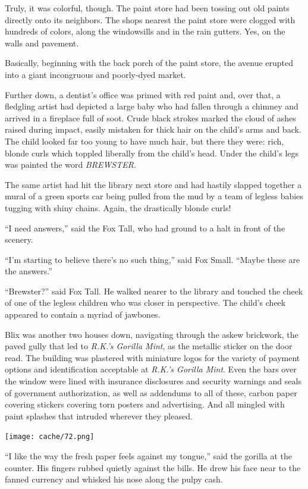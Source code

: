 \documentclass[12pt,twoside]{report}
\begin{document}
Truly, it was colorful, though.  The paint store had been tossing out
old paints directly onto its neighbors.  The shops nearest the paint
store were clogged with hundreds of colors, along the windowsills and
in the rain gutters.  Yes, on the walls and pavement.

Basically, beginning with the back porch of the paint store, the
avenue erupted into a giant incongruous and poorly-dyed market.

Further down, a dentist's office was primed with red paint and, over
that, a fledgling artist had depicted a large baby who had fallen
through a chimney and arrived in a fireplace full of soot. Crude black
strokes marked the cloud of ashes raised during impact, easily
mistaken for thick hair on the child's arms and back.  The child
looked far too young to have much hair, but there they were: rich,
blonde curls which toppled liberally from the child's head.  Under the
child's legs was painted the word {\em BREWSTER}.

The same artist had hit the library next store and had hastily slapped
together a mural of a green sports car being pulled from the mud by a
team of legless babies tugging with shiny chains. Again, the
drastically blonde curls!

``I need answers,'' said the Fox Tall, who had ground to a halt in
front of the scenery.

``I'm starting to believe there's no such thing,'' said Fox Small.
``Maybe these are the answers.''

``Brewster?'' said Fox Tall.  He walked nearer to the library and
touched the cheek of one of the legless children who was closer in
perspective.  The child's cheek appeared to contain a myriad of
jawbones.

Blix was another two houses down, navigating through the askew
brickwork, the paved gully that led to {\em R.K.'s Gorilla Mint}, as
the metallic sticker on the door read.  The building was plastered
with miniature logos for the variety of payment options and
identification acceptable at {\em R.K.'s Gorilla Mint}.  Even the bars
over the window were lined with insurance disclosures and security
warnings and seals of government authorization, as well as addendums
to all of these, carbon paper covering stickers covering torn posters
and advertising.  And all mingled with paint splashes that intruded
wherever they pleased.

	\texttt{[image: cache/72.png]}

``I like the way the fresh paper feels against my tongue,'' said the
        gorilla at the counter. His fingers rubbed quietly against the
        bills.  He drew his face near to the fanned currency and
        whisked his nose along the pulpy cash.
\end{document}
